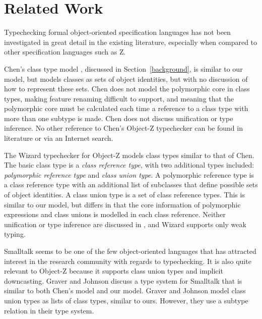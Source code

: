 \section{Related Work}

Typechecking formal object-oriented specification languages has not
been investigated in great detail in the existing literature,
especially when compared to other specification languages such as Z.

Chen's class type model \cite{chen94}, discussed in
Section~\ref{background}, is similar to our model, but models classes
as sets of object identities, but with no discussion of how to
represent these sets. Chen does not model the polymorphic core in
class types, making feature renaming difficult to support, and meaning
that the polymorphic core must be calculated each time a reference to
a class type with more than one subtype is made. Chen does not discuss
unification or type inference. No other reference to Chen's Object-Z
typechecker can be found in literature or via an Internet search.

The Wizard typechecker for Object-Z \cite{johnston96} models class
types similar to that of Chen. The basic class type is a {\em class
reference type}, with two additional types included: {\em
polymorphic reference type} and {\em class union type}. A polymorphic
reference type is a class reference type with an additional list of
subclasses that define possible sets of object identities. A class
union type is a set of class reference types. This is similar to
our model, but differs in that the core information of polymorphic
expressions and class unions is modelled in each class
reference. Neither unification or type inference are discussed in
\cite{johnston96}, and Wizard supports only weak typing.

Smalltalk \cite{goldberg83} seems to be one of the few object-oriented
languages that has attracted interest in the research community with
regards to typechecking. It is also quite relevant to Object-Z because
it supports class union types and implicit downcasting. Graver and
Johnson \cite{graver90} discuss a type system for Smalltalk that is
similar to both Chen's model and our model. Graver and Johnson model
class union types as lists of class types, similar to ours. However,
they use a subtype relation in their type system.

